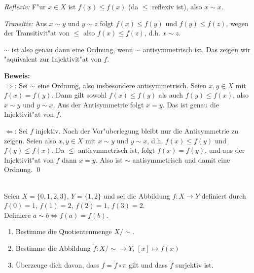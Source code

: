 \begin{loesung}
\begin{enumerate}[(i)]
\emph{Reflexiv:} F"ur $x\in X$ ist $f(x)\leq f(x)$ (da $\leq$ reflexiv ist), also $x\sim x$.

\emph{Transitiv:} Aus $x\sim y$ und $y\sim z$ folgt $f(x)\leq f(y)$ und $f(y)\leq f(z)$, wegen der Transitivit"at von $\leq$ also $f(x)\leq f(z)$, d.h. $x\sim z$.

$\sim$ ist also genau dann eine Ordnung, wenn $\sim$ antisymmetrisch ist. Das zeigen wir "aquivalent zur Injektivit"at von $f$.

\textbf{Beweis:}\\
\glqq $\Rightarrow$\grqq: Sei $\sim$ eine Ordnung, also insbesondere antisymmetrisch. Seien $x,y\in X$ mit $f(x)=f(y)$. Dann gilt sowohl $f(x)\leq f(y)$ als auch $f(y)\leq f(x)$, also $x\sim y$ und $y\sim x$. Aus der Antisymmetrie folgt $x=y$. Das ist genau die Injektivit"at von $f$.

\glqq $\Leftarrow$\grqq: Sei $f$ injektiv. Nach der Vor"uberlegung bleibt nur die Antisymmetrie zu zeigen. Seien also $x,y\in X$ mit $x\sim y$ und $y\sim x$, d.h. $f(x)\leq f(y)$ und $f(y)\leq f(x)$. Da $\leq$ antisymmetrisch ist, folgt $f(x)=f(y)$, und aus der Injektivit"at von $f$ dann $x=y$. Also ist $\sim$ antisymmetrisch und damit eine Ordnung. \qed
\end{enumerate}
\end{loesung}

\\
Seien $X=\{0,1,2,3\}$, $Y=\{1,2\}$ und sei die Abbildung $f:X\to Y$ definiert durch
$f(0)=1$, $f(1)=2$, $f(2)=1$, $f(3)=2$.\\
Definiere $a\sim b \Leftrightarrow f(a)=f(b).$
\begin{enumerate}
    \item Bestimme die Quotientenmenge \(X/{\sim}\).
    \item Bestimme die Abbildung $\widetilde f:X/{\sim}\to Y$, $[x]\mapsto f(x)$
    \item Überzeuge dich davon, dass $f=\widetilde f\circ\pi$ gilt und dass $\widetilde f$ surjektiv ist.
\end{enumerate}

